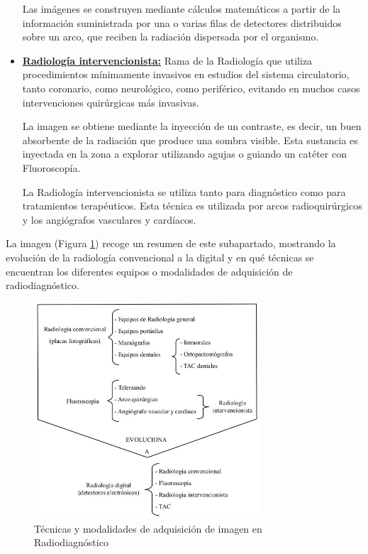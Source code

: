 \begin{itemize}
	Las imágenes se construyen mediante cálculos matemáticos a partir de la información suministrada por una o varias filas de detectores distribuidos sobre un arco, que reciben la radiación dispersada por el organismo.

\item \textbf{\underline{Radiología intervencionista:}} Rama de la Radiología que utiliza procedimientos mínimamente invasivos en estudios del sistema circulatorio, tanto coronario, como neurológico, como periférico, evitando en muchos casos intervenciones quirúrgicas más invasivas.

	La imagen se obtiene mediante la inyección de un contraste, es decir, un buen absorbente de la radiación que produce una sombra visible. Esta sustancia es inyectada en la zona a explorar utilizando agujas o guiando un catéter con Fluoroscopía.

	La Radiología intervencionista se utiliza tanto para diagnóstico como para tratamientos terapéuticos. Esta técnica es utilizada por arcos radioquirúrgicos y los angiógrafos vasculares y cardíacos.
\end{itemize}

La imagen (Figura \ref{fig:tecnicasModalidad}) recoge un resumen de este subapartado, mostrando la evolución de la radiología convencional a la digital y en qué técnicas se encuentran los diferentes equipos o modalidades de adquisición de radiodiagnóstico.

\begin{figure}[!h]
\begin{center}
\includegraphics[width=0.75\textwidth]{images/tecnicas_modalidad.jpg}
\caption{Técnicas y modalidades de adquisición de imagen en Radiodiagnóstico}
\label{fig:tecnicasModalidad}
\end{center}
\end{figure}

